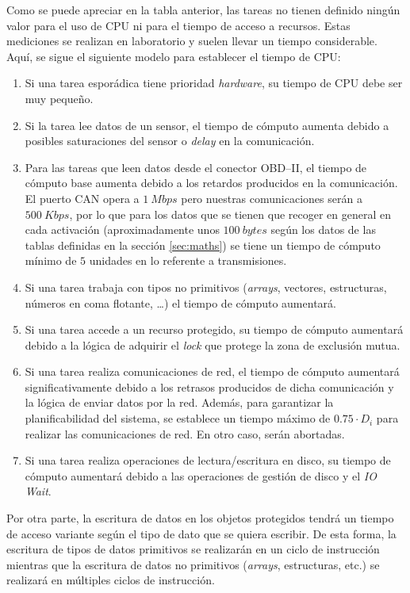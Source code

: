 Como se puede apreciar en la tabla anterior, las tareas no tienen definido ningún valor
para el uso de CPU ni para el tiempo de acceso a recursos. Estas mediciones se realizan
en laboratorio y suelen llevar un tiempo considerable. Aquí, se sigue el siguiente
modelo para establecer el tiempo de CPU:

\begin{enumerate}
  \item Si una tarea esporádica tiene prioridad \textit{hardware}, su tiempo de CPU
        debe ser muy pequeño.
  \item Si la tarea lee datos de un sensor, el tiempo de cómputo aumenta debido a
        posibles saturaciones del sensor o \textit{delay} en la comunicación.
  \item Para las tareas que leen datos desde el conector \ac{OBD}--II, el tiempo de
        cómputo base aumenta debido a los retardos producidos en la comunicación.
        El puerto \ac{CAN} opera a $1~Mbps$ pero nuestras comunicaciones serán a
        $500~Kbps$, por lo que para los datos que se tienen que recoger en general
        en cada activación (aproximadamente unos $100~bytes$ según los datos de
        las tablas definidas en la sección \ref{sec:maths}) se tiene un tiempo
        de cómputo mínimo de $5$ unidades en lo referente a transmisiones.
  \item Si una tarea trabaja con tipos no primitivos (\textit{arrays}, vectores,
        estructuras, números en coma flotante, \dots) el tiempo de cómputo aumentará.
  \item Si una tarea accede a un recurso protegido, su tiempo de cómputo aumentará
        debido a la lógica de adquirir el \textit{lock} que protege la zona de
        exclusión mutua.
  \item Si una tarea realiza comunicaciones de red, el tiempo de cómputo aumentará
        significativamente debido a los retrasos producidos de dicha comunicación
        y la lógica de enviar datos por la red. Además, para garantizar la
        planificabilidad del sistema, se establece un tiempo máximo de $0.75 \cdot D_i$
        para realizar las comunicaciones de red. En otro caso, serán abortadas.
  \item Si una tarea realiza operaciones de lectura/escritura en disco, su tiempo de
        cómputo aumentará debido a las operaciones de gestión de disco y el \textit{IO Wait}.
\end{enumerate}

Por otra parte, la escritura de datos en los objetos protegidos tendrá un tiempo de
acceso variante según el tipo de dato que se quiera escribir. De esta forma, la
escritura de tipos de datos primitivos se realizarán en un ciclo de instrucción
mientras que la escritura de datos no primitivos (\textit{arrays}, estructuras, etc.)
se realizará en múltiples ciclos de instrucción.

